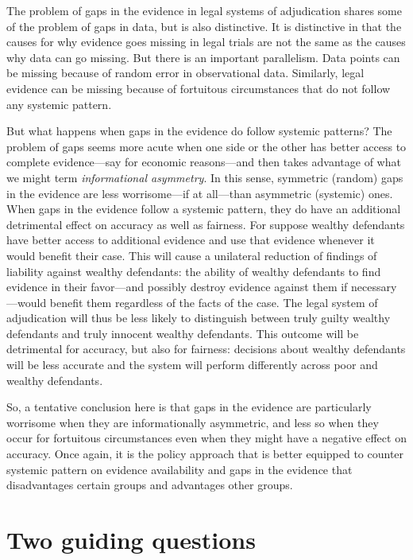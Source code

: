 \documentclass[
  10pt,
  dvipsnames,enabledeprecatedfontcommands]{scrartcl}
\begin{document}
The problem of gaps in the evidence in legal systems of adjudication
shares some of the problem of gaps in data, but is also distinctive. It
is distinctive in that the causes for why evidence goes missing in legal
trials are not the same as the causes why data can go missing. But there
is an important parallelism. Data points can be missing because of
random error in observational data. Similarly, legal evidence can be
missing because of fortuitous circumstances that do not follow any
systemic pattern.

But what happens when gaps in the evidence do follow systemic patterns?
The problem of gaps seems more acute when one side or the other has
better access to complete evidence---say for economic reasons---and then
takes advantage of what we might term \textit{informational asymmetry}.
In this sense, symmetric (random) gaps in the evidence are less
worrisome---if at all---than asymmetric (systemic) ones. When gaps in
the evidence follow a systemic pattern, they do have an additional
detrimental effect on accuracy as well as fairness. For suppose wealthy
defendants have better access to additional evidence and use that
evidence whenever it would benefit their case. This will cause a
unilateral reduction of findings of liability against wealthy
defendants: the ability of wealthy defendants to find evidence in their
favor---and possibly destroy evidence against them if necessary---would
benefit them regardless of the facts of the case. The legal system of
adjudication will thus be less likely to distinguish between truly
guilty wealthy defendants and truly innocent wealthy defendants. This
outcome will be detrimental for accuracy, but also for fairness:
decisions about wealthy defendants will be less accurate and the system
will perform differently across poor and wealthy defendants.

So, a tentative conclusion here is that gaps in the evidence are
particularly worrisome when they are informationally asymmetric, and
less so when they occur for fortuitous circumstances even when they
might have a negative effect on accuracy. Once again, it is the policy
approach that is better equipped to counter systemic pattern on evidence
availability and gaps in the evidence that disadvantages certain groups
and advantages other groups.

\hypertarget{two-guiding-questions}{%
\section{Two guiding questions}\label{two-guiding-questions}}
\end{document}
